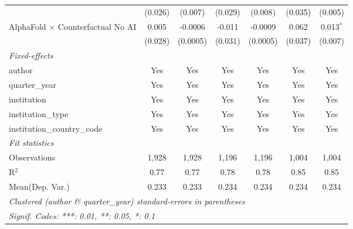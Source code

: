 \begin{tabular}{lcccccc}
                                            & (0.026)      & (0.007)      & (0.029) & (0.008)  & (0.035)      & (0.005)\\   
   AlphaFold $\times$ Counterfactual No AI  & 0.005        & -0.0006      & -0.011  & -0.0009  & 0.062        & 0.013$^{*}$\\   
                                            & (0.028)      & (0.0005)     & (0.031) & (0.0005) & (0.037)      & (0.007)\\   
   \midrule
   \emph{Fixed-effects}\\
   author                                   & Yes          & Yes          & Yes     & Yes      & Yes          & Yes\\  
   quarter\_year                            & Yes          & Yes          & Yes     & Yes      & Yes          & Yes\\  
   institution                              & Yes          & Yes          & Yes     & Yes      & Yes          & Yes\\  
   institution\_type                        & Yes          & Yes          & Yes     & Yes      & Yes          & Yes\\  
   institution\_country\_code               & Yes          & Yes          & Yes     & Yes      & Yes          & Yes\\  
   \midrule
   \emph{Fit statistics}\\
   Observations                             & 1,928        & 1,928        & 1,196   & 1,196    & 1,004        & 1,004\\  
   R$^2$                                    & 0.77         & 0.77         & 0.78    & 0.78     & 0.85         & 0.85\\  
Mean(Dep. Var.) & 0.233 & 0.233 & 0.234 & 0.234 & 0.234 & 0.234 \\
   \midrule \midrule
   \multicolumn{7}{l}{\emph{Clustered (author \& quarter\_year) standard-errors in parentheses}}\\
   \multicolumn{7}{l}{\emph{Signif. Codes: ***: 0.01, **: 0.05, *: 0.1}}\\
\end{tabular}
\par\endgroup

